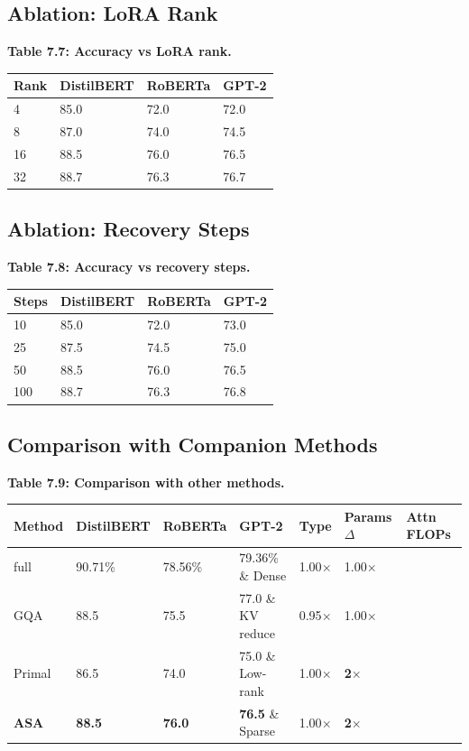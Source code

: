 \subsection{Ablation: LoRA Rank}

\textbf{Table 7.7: Accuracy vs LoRA rank.}

\begin{table}[H]
\centering
\small
\begin{tabular}{llll}
\toprule
\textbf{Rank} & \textbf{DistilBERT} & \textbf{RoBERTa} & \textbf{GPT-2} \\
\midrule
4 & 85.0 & 72.0 & 72.0 \\
8 & 87.0 & 74.0 & 74.5 \\
16 & 88.5 & 76.0 & 76.5 \\
32 & 88.7 & 76.3 & 76.7 \\
\bottomrule
\end{tabular}
\end{table}

\subsection{Ablation: Recovery Steps}

\textbf{Table 7.8: Accuracy vs recovery steps.}

\begin{table}[H]
\centering
\small
\begin{tabular}{llll}
\toprule
\textbf{Steps} & \textbf{DistilBERT} & \textbf{RoBERTa} & \textbf{GPT-2} \\
\midrule
10 & 85.0 & 72.0 & 73.0 \\
25 & 87.5 & 74.5 & 75.0 \\
50 & 88.5 & 76.0 & 76.5 \\
100 & 88.7 & 76.3 & 76.8 \\
\bottomrule
\end{tabular}
\end{table}

\subsection{Comparison with Companion Methods}

\textbf{Table 7.9: Comparison with other methods.}

\begin{table}[H]
\centering
\small
\begin{tabular}{lllllll}
\toprule
\textbf{Method} & \textbf{DistilBERT} & \textbf{RoBERTa} & \textbf{GPT-2} & \textbf{Type} & \textbf{Params $\Delta$} & \textbf{Attn FLOPs} \\
\midrule
full & 90.71\% & 78.56\% & 79.36\% \& Dense & 1.00$\times$ & 1.00$\times$ \\
GQA & 88.5 & 75.5 & 77.0 \& KV reduce & 0.95$\times$ & 1.00$\times$ \\
Primal & 86.5 & 74.0 & 75.0 \& Low-rank & 1.00$\times$ & \textbf{2$\times$} \\
\textbf{ASA} & \textbf{88.5} & \textbf{76.0} & \textbf{76.5} \& Sparse & 1.00$\times$ & \textbf{2$\times$} \\
\bottomrule
\end{tabular}
\end{table}

